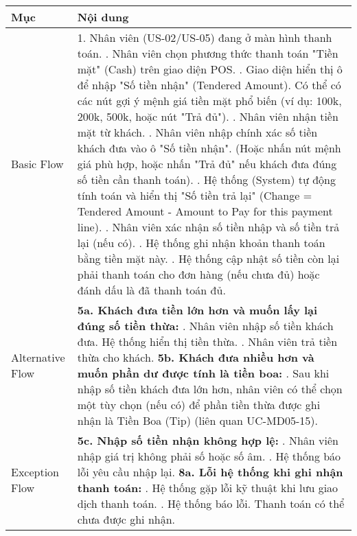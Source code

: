 \begin{longtable}{|m{4cm}|p{11cm}|}
\textbf{Mục} & \textbf{Nội dung} \\
\hline
Basic Flow & 1. Nhân viên (US-02/US-05) đang ở màn hình thanh toán. \newline 2. Nhân viên chọn phương thức thanh toán "Tiền mặt" (Cash) trên giao diện POS. \newline 3. Giao diện hiển thị ô để nhập "Số tiền nhận" (Tendered Amount). Có thể có các nút gợi ý mệnh giá tiền mặt phổ biến (ví dụ: 100k, 200k, 500k, hoặc nút "Trả đủ"). \newline 4. Nhân viên nhận tiền mặt từ khách. \newline 5. Nhân viên nhập chính xác số tiền khách đưa vào ô "Số tiền nhận". (Hoặc nhấn nút mệnh giá phù hợp, hoặc nhấn "Trả đủ" nếu khách đưa đúng số tiền cần thanh toán). \newline 6. Hệ thống (System) tự động tính toán và hiển thị "Số tiền trả lại" (Change = Tendered Amount - Amount to Pay for this payment line). \newline 7. Nhân viên xác nhận số tiền nhập và số tiền trả lại (nếu có). \newline 8. Hệ thống ghi nhận khoản thanh toán bằng tiền mặt này. \newline 9. Hệ thống cập nhật số tiền còn lại phải thanh toán cho đơn hàng (nếu chưa đủ) hoặc đánh dấu là đã thanh toán đủ. \\
\hline
Alternative Flow & \textbf{5a. Khách đưa tiền lớn hơn và muốn lấy lại đúng số tiền thừa:} \newline    1. Nhân viên nhập số tiền khách đưa. Hệ thống hiển thị tiền thừa. \newline    2. Nhân viên trả tiền thừa cho khách. \newline \textbf{5b. Khách đưa nhiều hơn và muốn phần dư được tính là tiền boa:} \newline    1. Sau khi nhập số tiền khách đưa lớn hơn, nhân viên có thể chọn một tùy chọn (nếu có) để phần tiền thừa được ghi nhận là Tiền Boa (Tip) (liên quan UC-MD05-15). \\
\hline
Exception Flow & \textbf{5c. Nhập số tiền nhận không hợp lệ:} \newline    1. Nhân viên nhập giá trị không phải số hoặc số âm. \newline    2. Hệ thống báo lỗi yêu cầu nhập lại. \newline \textbf{8a. Lỗi hệ thống khi ghi nhận thanh toán:} \newline    1. Hệ thống gặp lỗi kỹ thuật khi lưu giao dịch thanh toán. \newline    2. Hệ thống báo lỗi. Thanh toán có thể chưa được ghi nhận. \\

\end{longtable}
